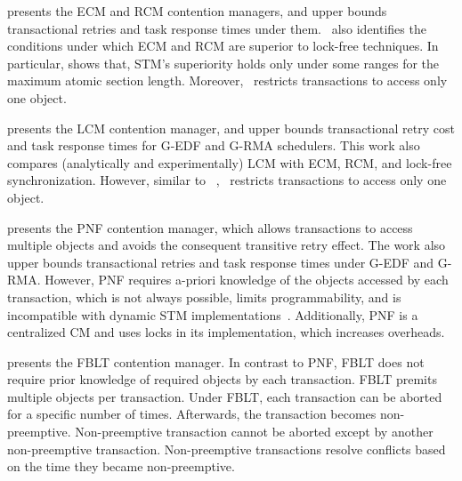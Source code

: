 \documentclass[conference]{IEEEtran}
\begin{document}
\cite{stmconcurrencycontrol:emsoft11} presents the ECM and RCM contention managers, and upper bounds transactional retries and task response times under them.~\cite{stmconcurrencycontrol:emsoft11} also identifies the conditions under which ECM and RCM are superior to lock-free techniques. In particular, \cite{stmconcurrencycontrol:emsoft11} shows that, STM's superiority holds only under some ranges for the maximum atomic section length.  Moreover,~\cite{stmconcurrencycontrol:emsoft11} restricts transactions to access only one object.

\cite{lcmdac2012} presents the LCM contention manager, and upper bounds transactional retry cost and task response times for G-EDF and G-RMA schedulers. This work also compares (analytically and experimentally) LCM with ECM, RCM, and lock-free synchronization. However, similar to~
\cite{lcmdac2012},~\cite{stmconcurrencycontrol:emsoft11} restricts transactions to access only one object. 

\cite{pnf_dac_asp} presents the PNF contention manager, which allows transactions to access  multiple objects and avoids the consequent transitive retry effect. The work also upper bounds transactional retries and task response times under G-EDF and G-RMA. However, PNF requires a-priori knowledge of the objects accessed by each transaction, which is not always possible, limits programmability, and is incompatible with dynamic STM implementations~\cite{Herlihy:2003:STM:872035.872048}. Additionally, PNF is a centralized CM and uses locks in its implementation, which increases overheads.

\cite{fblt} presents the FBLT contention manager. In contrast to PNF, FBLT does not require prior knowledge of required objects by each transaction. FBLT premits multiple objects per transaction.
Under FBLT, each transaction can be aborted for a specific number of times. Afterwards, the transaction becomes non-preemptive. Non-preemptive transaction cannot be aborted except by another non-preemptive transaction. Non-preemptive transactions resolve conflicts based on the time they became non-preemptive. 
\end{document}

